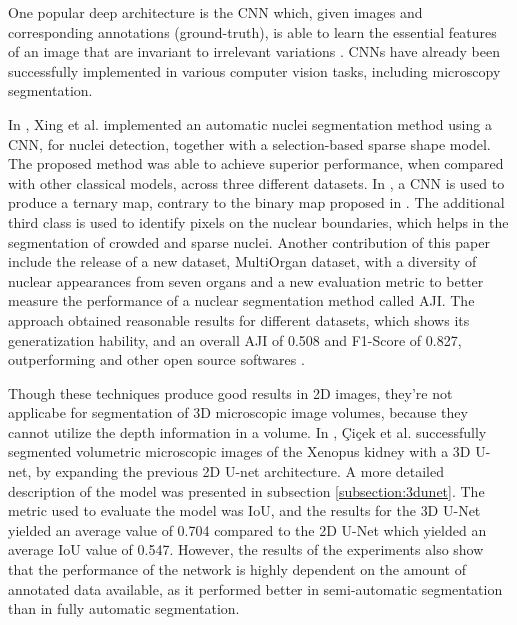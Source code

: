 One popular deep architecture is the \ac{CNN} which, given images and corresponding annotations (ground-truth), is able to learn the essential features of an image that are invariant to irrelevant variations \cite{guide:cnn}. \ac{CNNs} have already been successfully implemented in various computer vision tasks, including microscopy segmentation.

In \cite{CNN2}, Xing et al. implemented an automatic nuclei segmentation method using a \ac{CNN}, for nuclei detection, together with a selection-based sparse shape model. The proposed method was able to achieve superior performance, when compared with other classical models, across three different datasets. In \cite{CNN3}, a \ac{CNN} is used to produce a ternary map, contrary to the binary map proposed in \cite{CNN2}. The additional third class is used to identify pixels on the nuclear boundaries, which helps in the segmentation of crowded and sparse nuclei. Another contribution of this paper include the release of a new dataset, MultiOrgan dataset, with a diversity of nuclear appearances from seven organs and a new evaluation metric to better measure the performance of a nuclear segmentation method called \ac{AJI}. The approach obtained reasonable results for different datasets, which shows its generatization hability, and an overall \ac{AJI} of 0.508 and F1-Score of  0.827, outperforming \cite{CNN2} and other open source softwares \cite{cellprofiler}. 

Though these techniques produce good results in \ac{2D} images, they're not applicabe for segmentation of \ac{3D} microscopic image volumes, because they cannot utilize the depth information in a volume. In \cite{Unet:3D}, Çiçek et al. successfully segmented volumetric microscopic images of the Xenopus kidney with a \ac{3D} U-net, by expanding the previous \ac{2D} U-net \cite{Unet:2D} architecture. A more detailed description of the model was presented in subsection \ref{subsection:3dunet}. The metric used to evaluate the model was \ac{IoU}, and the results for the \ac{3D} U-Net yielded an average value of 0.704 compared to the \ac{2D} U-Net which yielded an average \ac{IoU} value of 0.547. However, the results of the experiments also show that the performance of the network is highly dependent on the amount of annotated data available, as it performed better in semi-automatic segmentation than in fully automatic segmentation.


